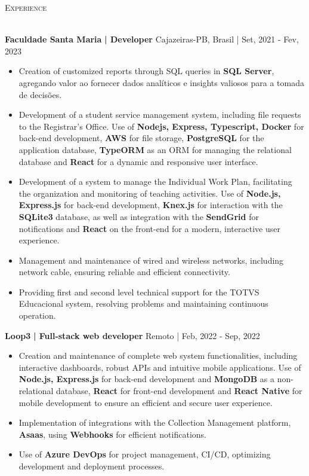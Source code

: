 \documentclass[a4paper]{article}
\newcommand{\lineunder} {
    \vspace*{-8pt} \\
    \hspace*{-18pt} \hrulefill \\
}
\newcommand{\header} [1] {
    {\hspace*{-18pt}\vspace*{6pt} \textsc{#1}}
    \vspace*{-6pt} \lineunder
}
\begin{document}
%
%
\header{Experience}
\vspace{2mm}

\textbf{Faculdade Santa Maria}\textbf{ | Developer} \hfill Cajazeiras-PB, Brasil | Set, 2021 - Fev, 2023\\
\vspace{-3mm}
\begin{itemize} \itemsep -3pt
    \item  Creation of customized reports through SQL queries in  \textbf{SQL Server}, agregando valor ao fornecer dados analíticos e insights valiosos para a tomada de decisões.
    \item  Development of a student service management system, including file requests to the Registrar's Office. Use of \textbf{Nodejs, Express, Typescript, Docker} for back-end development,
          \textbf{AWS} for file storage, \textbf{PostgreSQL} for the application database, \textbf{TypeORM} as an ORM for managing the relational database and \textbf{React} for a dynamic and responsive user interface.
    \item  Development of a system to manage the Individual Work Plan, facilitating the organization and monitoring of teaching activities. Use of \textbf{Node.js, Express.js} for back-end development,
          \textbf{Knex.js} for interaction with the \textbf{SQLite3} database, as well as integration with the \textbf{SendGrid} for notifications and \textbf{React} on the front-end for a modern, interactive user experience.
    \item  Management and maintenance of wired and wireless networks, including network cable, ensuring reliable and efficient connectivity.
    \item  Providing first and second level technical support for the TOTVS Educacional system, resolving problems and maintaining continuous operation.
\end{itemize}
\textbf{Loop3}\textbf{ | Full-stack web developer} \hfill Remoto | Feb, 2022 - Sep, 2022\\
\vspace{-3mm}
\begin{itemize} \itemsep -3pt
    \item Creation and maintenance of complete web system functionalities, including interactive dashboards, robust APIs and intuitive mobile applications. Use of  \textbf{Node.js, Express.js} for back-end development and \textbf{MongoDB} as a non-relational database, \textbf{React} for front-end development and \textbf{React Native} for mobile development to ensure an efficient and secure user experience.
    \item Implementation of integrations with the Collection Management platform, \textbf{Asaas}, using \textbf{Webhooks} for efficient notifications.
    \item Use of \textbf{Azure DevOps} for project management, CI/CD, optimizing development and deployment processes.


\end{itemize}
\end{document}
